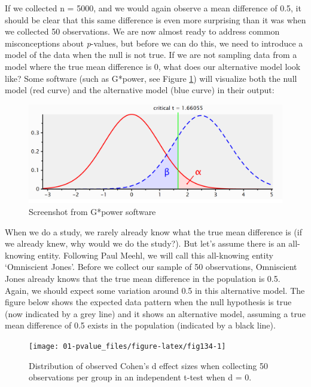 \documentclass[
  oneside]{book}
\begin{document}
If we collected n = 5000, and we would again observe a mean difference of 0.5, it should be clear that this same difference is even more surprising than it was when we collected 50 observations. We are now almost ready to address common misconceptions about \emph{p}-values, but before we can do this, we need to introduce a model of the data when the null is not true. If we are not sampling data from a model where the true mean difference is 0, what does our alternative model look like? Some software (such as G*power, see Figure \ref{fig:gpower-screenshot}) will visualize both the null model (red curve) and the alternative model (blue curve) in their output:

\begin{figure}

{\centering \includegraphics[width=1\linewidth]{images/1.3.3} 

}

\caption{Screenshot from G*power software}\label{fig:gpower-screenshot}
\end{figure}

When we do a study, we rarely already know what the true mean difference is (if we already knew, why would we do the study?). But let's assume there is an all-knowing entity. Following Paul Meehl, we will call this all-knowing entity `Omniscient Jones'. Before we collect our sample of 50 observations, Omniscient Jones already knows that the true mean difference in the population is 0.5. Again, we should expect some variation around 0.5 in this alternative model. The figure below shows the expected data pattern when the null hypothesis is true (now indicated by a grey line) and it shows an alternative model, assuming a true mean difference of 0.5 exists in the population (indicated by a black line).

\begin{figure}

{\centering \texttt{[image: 01-pvalue\_files/figure-latex/fig134-1]} 

}

\caption{Distribution of observed Cohen's d effect sizes when collecting 50 observations per group in an independent t-test when d = 0.}\label{fig:fig134}
\end{figure}
\end{document}
